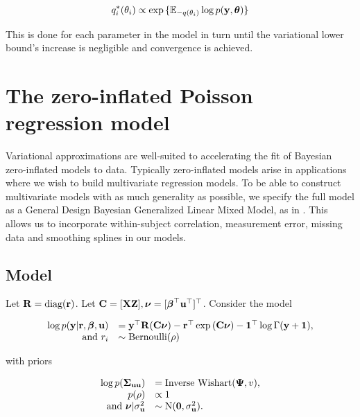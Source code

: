 \documentclass{article}[12pt]
\begin{document}
$$q_i^*(\theta_i) \propto \exp{\{ {\mathbb E}_{-q(\theta_i)} \log p({\bf y}, {\boldsymbol\theta}) \}}$$

This is done for each parameter in the model in turn until the variational lower bound's increase is
negligible and convergence is achieved.

\section{The zero-inflated Poisson regression model}

Variational approximations are well-suited to accelerating the fit of Bayesian zero-inflated models to data.
Typically zero-inflated models arise in applications where we wish to build multivariate regression models. To
be able to construct multivariate models with as much generality as possible, we specify the full model as a
General Design Bayesian Generalized Linear Mixed Model, as in \citep{zhao06}. This allows us to incorporate
within-subject correlation, measurement error, missing data and smoothing splines in our models.


\subsection{Model}

Let ${\bf R} = \text{diag}{({\bf r})}$. Let ${\bf C} = [{\bf X} {\bf Z}], {\boldsymbol \nu} = [{\boldsymbol \beta}^\top
{\bf u}^\top]^\top$. Consider the model

$$
\begin{array}{rl}
\log{p({\bf y}|{\bf r}, {\boldsymbol\beta}, {\bf u})} &= {\bf y}^\top {\bf R} ({\bf C}{\boldsymbol \nu}) - {\bf r}^\top \exp{({\bf C}{\boldsymbol\nu})} - {\bf 1}^\top \log{\Gamma{({\bf y}+ {\bf1})}}, \\
\mbox{ and }
r_i &\sim \text{Bernoulli}(\rho) \\
\end{array}
$$

with priors

$$ 
\begin{array}{rl}
\log{p({\boldsymbol\Sigma}_{{\bf u}{\bf u}})} &= \text{Inverse Wishart}({\boldsymbol \Psi}, v),\\
p(\rho) &\propto 1 \\
\mbox{ and } {\boldsymbol\nu}|\sigma_{\bf u}^2 &\sim \mbox{N}({\bf 0}, \sigma_{\bf u}^2). \\
\end{array}
$$
\end{document}
